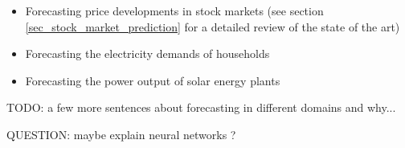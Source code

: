\begin{itemize}
	\item Forecasting price developments in stock markets (see section \ref{sec_stock_market_prediction} for a detailed review of the state of the art)
	\item Forecasting the electricity demands of households \cite{veit2014household}
	\item Forecasting the power output of solar energy plants \cite{inman2013solar}
\end{itemize}

TODO: a few more sentences about forecasting in different domains and why...

QUESTION: maybe explain neural networks ?
